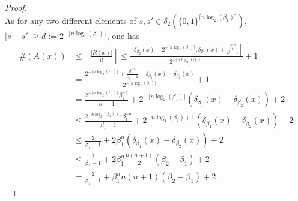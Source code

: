\begin{proof}
\begin{equation}
	\end{equation}
	As for any two different elements of $s,s' \in \delta_2\left(\{0,1\}^{\lceil n \log_2(\beta_1)\rceil}\right)$, $|s - s'| \geq d := 2^{-\lceil n \log_2(\beta_1)\rceil}$, one has
	\begin{align}
		\#(A(x)) &\leq \left\lceil \frac{|R(x)|}{d}\right\rceil \leq \frac{\left[\delta_{\beta_2}(x)- 2^{-\lceil n \log_2(\beta_1)\rceil},\delta_{\beta_1}(x) + \frac{\beta_1^{-n}}{\beta_1 - 1}\right]}{2^{-\lceil n \log_2(\beta_1)\rceil}} + 1\\
		&= \frac{2^{-\lceil n \log_2(\beta_1)\rceil} + \frac{\beta_1^{-n}}{\beta_1 - 1} + \delta_{\beta_1}(x) - \delta_{\beta_2}(x)}{2^{-\lceil n \log_2(\beta_1)\rceil}} + 1\\
		& = \frac{2^{-\lceil n \log_2(\beta_1)\rceil}\beta_1^{-n}}{\beta_1 - 1} + 2^{-\lceil n \log_2(\beta_1)\rceil} \left(\delta_{\beta_1}(x) - \delta_{\beta_2}(x)\right) + 2 \\
		&\leq \frac{2^{-n \log_2(\beta_1) + 1}\beta_1^{-n}}{\beta_1 - 1} + 2^{-n \log_2(\beta_1) + 1} \left(\delta_{\beta_1}(x) - \delta_{\beta_2}(x)\right) + 2\\
		 &\leq \frac{2}{\beta_1 -1} + 2\beta_1^n \left(\delta_{\beta_1}(x) - \delta_{\beta_2}(x)\right) + 2\\
		 &\leq \frac{2}{\beta_1 -1} + 2\beta_1^n \frac{n(n+1)}{2} (\beta_2-\beta_1) + 2\\
		 &= \frac{2}{\beta_1 -1} + \beta_1^n n(n+1) (\beta_2-\beta_1) + 2.
	\end{align}
\end{proof}

